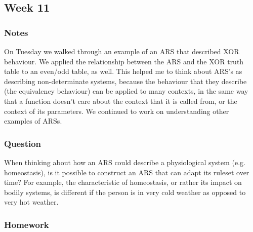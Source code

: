 \documentclass{article}
\theoremstyle{theorem}
\theoremstyle{definition}
\theoremstyle{remark}
\begin{document}
\subsection{Week 11}

\subsubsection*{Notes} On Tuesday we walked through an example of an ARS that described XOR behaviour. We applied the relationship between the ARS and the XOR truth table to an even/odd table, as well. This helped me to think about ARS's as describing non-determinate systems, because the behaviour that they describe (the equivalency behaviour) can be applied to many contexts, in the same way that a function doesn't care about the context that it is called from, or the context of its parameters. We continued to work on understanding other examples of ARSs. 

\subsubsection*{Question} When thinking about how an ARS could describe a physiological system (e.g. homeostasis), is it possible to construct an ARS that can adapt its ruleset over time? For example, the characteristic of homeostasis, or rather its impact on bodily systems, is different if the person is in very cold weather as opposed to very hot weather.

\subsubsection*{Homework}
\end{document}
